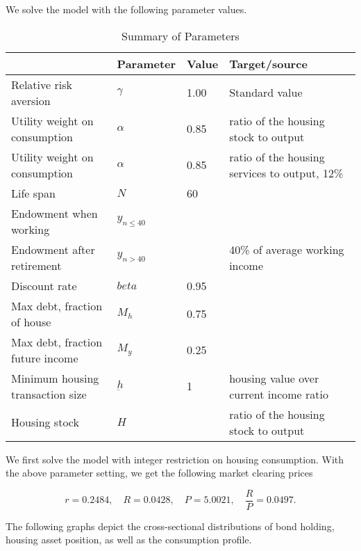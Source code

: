 \documentclass[a4paper,10pt]{article}
\begin{document}
We solve the model with the following parameter values.

\begin{table} [h!]

\caption{Summary of Parameters}
\footnotesize
\begin{adjustwidth}{-1cm}{-1cm}%
\centering
\begin{tabular}{l l l l}
\hline
& Parameter & Value & Target/source\\
\hline
Relative risk aversion & $\gamma$ & 1.00 &  Standard value \\
Utility weight on consumption & $\alpha$ & 0.85 & ratio of the housing stock to output \\
Utility weight on consumption & $\alpha$ & 0.85 & ratio of the housing services to output, 12\% \\
Life span & $N$ & 60 &  \\
Endowment when working &$y_{n\le40}$ &  &   \\
Endowment after retirement & $y_{n>40}$ &  &  40\% of average working income \\
Discount rate & $beta$ & 0.95 &   \\
Max debt, fraction of house &$M_h$ & 0.75 &   \\
Max debt, fraction future income & $M_y$ &0.25 & \\
Minimum housing transaction size &    $\underbar{h}$    &  1   & housing value over current income ratio\\
Housing stock &  $H$   &    & ratio of the housing stock to output\\

\hline
\end{tabular}
\end{adjustwidth}
\label{table_calibration}
\end{table}

\vspace{1cm}
We first solve the model with integer restriction on housing consumption. With the above parameter setting, we get the following market clearing prices

\[r = 0.2484, \quad R=0.0428, \quad P=5.0021, \quad \frac{R}{P}=0.0497.\]

\vspace{1cm}

The following graphs depict the cross-sectional distributions of bond holding, housing asset position, as well as the consumption profile.

\vspace{2cm}
\end{document}
